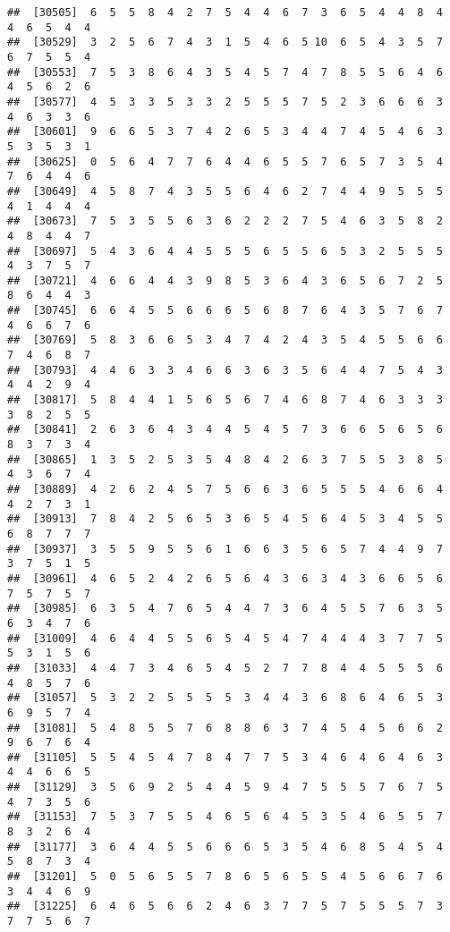\documentclass[
]{book}
\begin{document}
\begin{verbatim}
##  [30505]  6  5  5  8  4  2  7  5  4  4  6  7  3  6  5  4  4  8  4  4  6  5  4  4
##  [30529]  3  2  5  6  7  4  3  1  5  4  6  5 10  6  5  4  3  5  7  6  7  5  5  4
##  [30553]  7  5  3  8  6  4  3  5  4  5  7  4  7  8  5  5  6  4  6  4  5  6  2  6
##  [30577]  4  5  3  3  5  3  3  2  5  5  5  7  5  2  3  6  6  6  3  4  6  3  3  6
##  [30601]  9  6  6  5  3  7  4  2  6  5  3  4  4  7  4  5  4  6  3  5  3  5  3  1
##  [30625]  0  5  6  4  7  7  6  4  4  6  5  5  7  6  5  7  3  5  4  7  6  4  4  6
##  [30649]  4  5  8  7  4  3  5  5  6  4  6  2  7  4  4  9  5  5  5  4  1  4  4  4
##  [30673]  7  5  3  5  5  6  3  6  2  2  2  7  5  4  6  3  5  8  2  4  8  4  4  7
##  [30697]  5  4  3  6  4  4  5  5  5  6  5  5  6  5  3  2  5  5  5  4  3  7  5  7
##  [30721]  4  6  6  4  4  3  9  8  5  3  6  4  3  6  5  6  7  2  5  8  6  4  4  3
##  [30745]  6  6  4  5  5  6  6  6  5  6  8  7  6  4  3  5  7  6  7  4  6  6  7  6
##  [30769]  5  8  3  6  6  5  3  4  7  4  2  4  3  5  4  5  5  6  6  7  4  6  8  7
##  [30793]  4  4  6  3  3  4  6  6  3  6  3  5  6  4  4  7  5  4  3  4  4  2  9  4
##  [30817]  5  8  4  4  1  5  6  5  6  7  4  6  8  7  4  6  3  3  3  3  8  2  5  5
##  [30841]  2  6  3  6  4  3  4  4  5  4  5  7  3  6  6  5  6  5  6  8  3  7  3  4
##  [30865]  1  3  5  2  5  3  5  4  8  4  2  6  3  7  5  5  3  8  5  4  3  6  7  4
##  [30889]  4  2  6  2  4  5  7  5  6  6  3  6  5  5  5  4  6  6  4  4  2  7  3  1
##  [30913]  7  8  4  2  5  6  5  3  6  5  4  5  6  4  5  3  4  5  5  6  8  7  7  7
##  [30937]  3  5  5  9  5  5  6  1  6  6  3  5  6  5  7  4  4  9  7  3  7  5  1  5
##  [30961]  4  6  5  2  4  2  6  5  6  4  3  6  3  4  3  6  6  5  6  7  5  7  5  7
##  [30985]  6  3  5  4  7  6  5  4  4  7  3  6  4  5  5  7  6  3  5  6  3  4  7  6
##  [31009]  4  6  4  4  5  5  6  5  4  5  4  7  4  4  4  3  7  7  5  5  3  1  5  6
##  [31033]  4  4  7  3  4  6  5  4  5  2  7  7  8  4  4  5  5  5  6  4  8  5  7  6
##  [31057]  5  3  2  2  5  5  5  5  3  4  4  3  6  8  6  4  6  5  3  6  9  5  7  4
##  [31081]  5  4  8  5  5  7  6  8  8  6  3  7  4  5  4  5  6  6  2  9  6  7  6  4
##  [31105]  5  5  4  5  4  7  8  4  7  7  5  3  4  6  4  6  4  6  3  4  4  6  6  5
##  [31129]  3  5  6  9  2  5  4  4  5  9  4  7  5  5  5  7  6  7  5  4  7  3  5  6
##  [31153]  7  5  3  7  5  5  4  6  5  6  4  5  3  5  4  6  5  5  7  8  3  2  6  4
##  [31177]  3  6  4  4  5  5  6  6  6  5  3  5  4  6  8  5  4  5  4  5  8  7  3  4
##  [31201]  5  0  5  6  5  5  7  8  6  5  6  5  5  4  5  6  6  7  6  3  4  4  6  9
##  [31225]  6  4  6  5  6  6  2  4  6  3  7  7  5  7  5  5  5  7  3  7  7  5  6  7

\end{verbatim}
\end{document}
